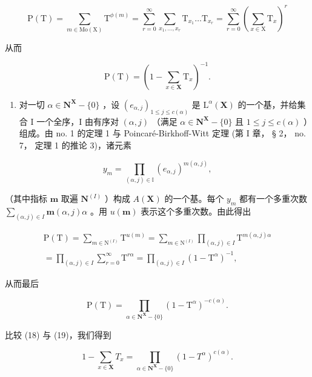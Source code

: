 \[
\mathrm{P} (\mathrm{T}) = \sum_ {m \in \mathrm{Mo} (\mathrm{X})} \mathrm{T} ^ {\phi (m)} = \sum_ {r = 0} ^ {\infty} \sum_ {x _ {1}, \dots , x _ {r}} \mathrm{T} _ {x _ {1}} \dots \mathrm{T} _ {x _ {r}} = \sum_ {r = 0} ^ {\infty} \left(\sum_ {x \in \mathrm{X}} \mathrm{T} _ {x}\right) ^ {r}
\]

从而

\[
\mathrm{P} (\mathrm{T}) = \left(1 - \sum_ {x \in \mathbf {X}} \mathrm{T} _ {x}\right) ^ {- 1}.\tag{18}
\]

\begin{enumerate}
\def\labelenumi{(\arabic{enumi})}
\setcounter{enumi}{1}
\tightlist
\item
  对一切 \(\alpha \in \mathbf{N}^{\mathbf{X}} - \{0\}\) ，设 \((e_{\alpha,j})_{1 \leqslant j \leqslant c(\alpha)}\) 是 \(\mathrm{L}^{\alpha}(\mathbf{X})\) 的一个基，并给集合 I 一个全序，I 由有序对 \((\alpha, j)\) （满足 \(\alpha \in \mathbf{N}^{\mathbf{X}} - \{0\}\) 且 \(1 \leqslant j \leqslant c(\alpha)\) ）组成。由 no. 1 的定理 1 与 Poincaré-Birkhoff-Witt 定理 (第 I 章， § 2， no. 7， 定理 1 的推论 3)，诸元素
\end{enumerate}

\[
y _ {m} = \prod_ {(\alpha , j) \in \mathbb {I}} (e _ {\alpha , j}) ^ {m (\alpha , j)},
\]

（其中指标 \(\pmb{m}\) 取遍 \(\mathbf{N}^{(I)}\) ）构成 \(A(\mathbf{X})\) 的一个基。每个 \(y_{m}\) 都有一个多重次数 \(\sum_{(\alpha, j) \in I} \pmb{m}(\alpha, j)\alpha\) 。用 \(u(\pmb{m})\) 表示这个多重次数。由此得出

\[
\begin{array}{l} \mathrm{P(T)} = \sum_ {m \in \mathrm{N} ^ {(I)}} \mathrm{T} ^ {u (m)} = \sum_ {m \in \mathrm{N} ^ {(I)}} \prod_ {(\alpha , j) \in I} \mathrm{T} ^ {m (\alpha , j) \alpha} \\ = \prod_ {(\alpha , j) \in I} \sum_ {r = 0} ^ {\infty} \mathrm{T} ^ {r \alpha} = \prod_ {(\alpha , j) \in I} (1 - \mathrm{T} ^ {\alpha}) ^ {- 1}, \end{array}
\]

从而最后

\[
\mathrm{P} (\mathrm{T}) = \prod_ {\alpha \in \mathbf {N} ^ {\mathbf {X}} - \{0 \}} (1 - \mathrm{T} ^ {\alpha}) ^ {- c (\alpha)}.\tag{19}
\]

比较 (18) 与 (19)，我们得到

\[
1 - \sum_ {x \in \mathbf {X}} T _ {x} = \prod_ {\alpha \in \mathbf {N} ^ {\mathbf {X}} - \{0\}} (1 - T ^ {\alpha}) ^ {c (\alpha)}.\tag{20}
\]

